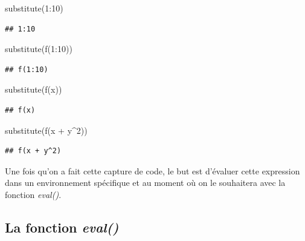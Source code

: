 \documentclass[
]{book}
\newenvironment{Shaded}{\begin{snugshade}}{\end{snugshade}}
\newcommand{\DecValTok}[1]{\textcolor[rgb]{0.00,0.00,0.81}{#1}}
\newcommand{\FunctionTok}[1]{\textcolor[rgb]{0.00,0.00,0.00}{#1}}
\newcommand{\NormalTok}[1]{#1}
\newcommand{\SpecialCharTok}[1]{\textcolor[rgb]{0.00,0.00,0.00}{#1}}
\theoremstyle{definition}
\theoremstyle{definition}
\theoremstyle{definition}
\theoremstyle{definition}
\theoremstyle{remark}
\begin{document}
\begin{Shaded}
\begin{Highlighting}[]
\FunctionTok{substitute}\NormalTok{(}\DecValTok{1}\SpecialCharTok{:}\DecValTok{10}\NormalTok{)}
\end{Highlighting}
\end{Shaded}

\begin{verbatim}
## 1:10
\end{verbatim}

\begin{Shaded}
\begin{Highlighting}[]
\FunctionTok{substitute}\NormalTok{(}\FunctionTok{f}\NormalTok{(}\DecValTok{1}\SpecialCharTok{:}\DecValTok{10}\NormalTok{))}
\end{Highlighting}
\end{Shaded}

\begin{verbatim}
## f(1:10)
\end{verbatim}

\begin{Shaded}
\begin{Highlighting}[]
\FunctionTok{substitute}\NormalTok{(}\FunctionTok{f}\NormalTok{(x))}
\end{Highlighting}
\end{Shaded}

\begin{verbatim}
## f(x)
\end{verbatim}

\begin{Shaded}
\begin{Highlighting}[]
\FunctionTok{substitute}\NormalTok{(}\FunctionTok{f}\NormalTok{(x }\SpecialCharTok{+}\NormalTok{ y}\SpecialCharTok{\^{}}\DecValTok{2}\NormalTok{))}
\end{Highlighting}
\end{Shaded}

\begin{verbatim}
## f(x + y^2)
\end{verbatim}

Une fois qu'on a fait cette capture de code, le but est d'évaluer cette expression dans un environnement spécifique et au moment où on le souhaitera avec la fonction \emph{eval()}.

\hypertarget{la-fonction-eval}{%
\subsection{\texorpdfstring{La fonction \emph{eval()}}{La fonction eval()}}\label{la-fonction-eval}}
\end{document}
